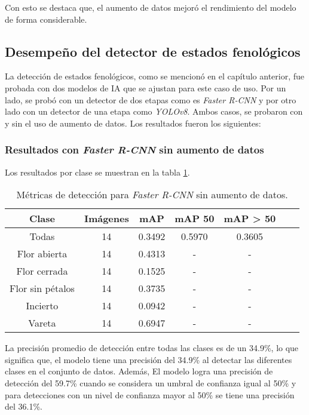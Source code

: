 Con esto se destaca que, el aumento de datos mejoró el rendimiento del modelo de forma considerable.

\subsection{Desempeño del detector de estados fenológicos}

La detección de estados fenológicos, como se mencionó en el capítulo anterior, fue probada con dos modelos de IA que se ajustan para este caso de uso. Por un lado, se probó con un detector de dos etapas como es \textit{Faster R-CNN} y por otro lado con un detector de una etapa como \textit{YOLOv8}. Ambos casos, se probaron con y sin el uso de aumento de datos. Los resultados fueron los siguientes:

\subsubsection{Resultados con \textit{Faster R-CNN} sin aumento de datos}

Los resultados por clase se muestran en la tabla \ref{tab:resultadosFasterSinAug}.

\begin{table}[h]
	\centering
	\caption{Métricas de detección para \textit{Faster R-CNN} sin aumento de datos.}
	\begin{tabular}{c c c c c c c}    
		\toprule
		\textbf{Clase}&\textbf{Imágenes}&\textbf{mAP}&\textbf{mAP 50}&\textbf{mAP > 50}\\
		\midrule
		Todas & 14 & 0.3492 & 0.5970 & 0.3605\\
		Flor abierta & 14 & 0.4313 & - & - \\
		Flor cerrada & 14 & 0.1525 & - & - \\
		Flor sin pétalos & 14 & 0.3735 & - & - \\
		Incierto & 14 & 0.0942 & - & - \\
		Vareta & 14 & 0.6947 & - & - \\		
		\bottomrule
		\hline
	\end{tabular}
	\label{tab:resultadosFasterSinAug}
\end{table}
\newpage
La precisión promedio de detección entre todas las clases es de un 34.9\%, lo que significa que, el modelo tiene una precisión del 34.9\% al detectar las diferentes clases en el conjunto de datos. Además, El modelo logra una precisión de detección del 59.7\% cuando se considera un umbral de confianza igual al 50\% y para detecciones con un nivel de confianza mayor al 50\% se tiene una precisión del 36.1\%.

